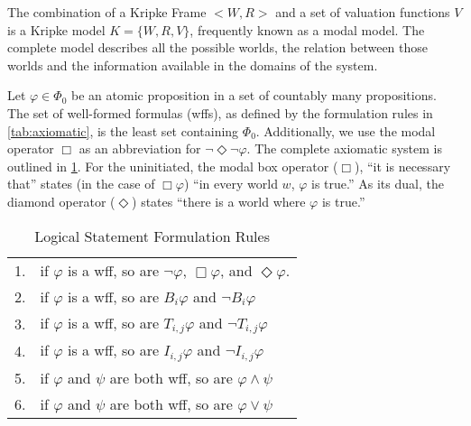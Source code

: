 The combination of a Kripke Frame $< W,R >$ and a set of valuation functions $V$ is a Kripke model $K = \{W, R, V\}$, frequently known as a modal model.
The complete model describes all the possible worlds, the relation between those worlds and the information available in the domains of the system.

Let $\varphi \in \Phi_0$ be an atomic proposition in a set of countably many propositions.
The set of well-formed formulas (wffs), as defined by the formulation rules in \ref{tab:axiomatic}, is the least set containing $\Phi_0$.
Additionally, we use the modal operator $\Box$ as an abbreviation for $\neg \Diamond \neg \varphi$.
The complete axiomatic system is outlined in \ref{tab:wffs}.
For the uninitiated, the modal box operator ($\Box$), ``it is necessary that'' states (in the case of $\Box \varphi$) ``in every world $w$, $\varphi$ is true.'' As its dual, the diamond operator ($\Diamond$) states ``there is a world where $\varphi$ is true.''

\begin{table}[]
\small
\centering
\caption{Logical Statement Formulation Rules}
\begin{tabular}{r l}
1. & if $\varphi$ is a wff, so are $\neg \varphi$, $\Box \varphi$, and $\Diamond \varphi$. \\
2. & if $\varphi$ is a wff, so are $B_i \varphi$ and $\neg B_i \varphi$ \\
3. & if $\varphi$ is a wff, so are $T_{i,j} \varphi$ and $\neg T_{i,j} \varphi$ \\
4. & if $\varphi$ is a wff, so are $I_{i,j} \varphi$ and $\neg I_{i,j} \varphi$ \\
5. & if $\varphi$ and $\psi$ are both wff, so are $\varphi \wedge \psi$ \\
6. & if $\varphi$ and $\psi$ are both wff, so are $\varphi \vee \psi$ \\
\end{tabular}
\label{tab:wffs}
\end{table}

